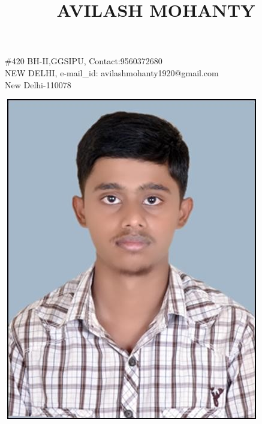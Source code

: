 \documentclass{article}
\begin{document}
\title{\begin{huge}AVILASH MOHANTY\end{huge}}
\maketitle

\begin{flushleft}
$\#$420 BH-II,GGSIPU, 
\hfill{Contact:9560372680}\\
NEW DELHI, 
\hfill{e-mail\_id: avilashmohanty1920@gmail.com}\\
New Delhi-110078

\end{flushleft}

\begin{flushright}
\includegraphics [scale=0.25]{picture.jpg}
\end{flushright}

\end{document}
